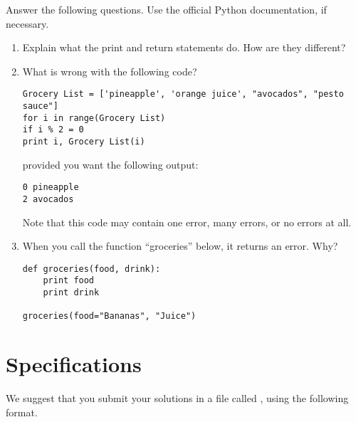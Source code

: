 \begin{problem}
Answer the following questions. Use the official Python documentation, if necessary.

\begin{enumerate}
\item Explain what the print and return statements do. How are they different?
\item What is wrong with the following code?
\begin{lstlisting}
Grocery List = ['pineapple', 'orange juice', "avocados", "pesto sauce"]
for i in range(Grocery List)
if i % 2 = 0
print i, Grocery List(i)
\end{lstlisting}
provided you want the following output:
\begin{lstlisting}
0 pineapple
2 avocados
\end{lstlisting}
Note that this code may contain one error, many errors, or no errors at all.
\item When you call the function ``groceries'' below, it returns an error. Why?
\begin{lstlisting}
def groceries(food, drink):
    print food
    print drink    

groceries(food="Bananas", "Juice")
\end{lstlisting}
\end{enumerate}
\end{problem}



\section*{Specifications}
We suggest that you submit your solutions in a file called , using the following format.

